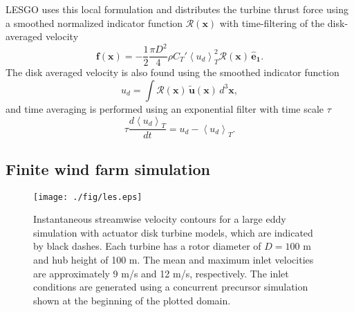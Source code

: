 LESGO uses this local formulation and distributes the turbine thrust force using a smoothed normalized indicator function $\mathcal{R}(\mathbf{x})$ with time-filtering of the disk-averaged velocity 
\begin{equation}
\mathbf{f}(\mathbf{x}) = -\frac{1}{2} \frac{\pi D^2}{4} \rho C_T' \left\langle u_d\right\rangle_T^2 \mathcal{R}(\mathbf{x}) \,\mathbf{\hat{e}_1}.
\end{equation}
The disk averaged velocity is also found using the smoothed indicator function
\begin{equation}
u_d = \int \mathcal{R}(\mathbf{x}) \, \tilde{\mathbf{u}}(\mathbf{x}) \, d^3\mathbf{x},
\end{equation}
and time averaging is performed using an exponential filter with time scale $\tau$
\begin{equation}
\tau \frac{ d \left\langle u_d \right\rangle_T}{dt} = u_d - \left\langle u_d \right\rangle_T.
\end{equation}



\subsection{Finite wind farm simulation}
\label{subsec:methods-les-farm}
\begin{figure}[b!]
\begin{center}
\texttt{[image: ./fig/les.eps]}
\end{center}
\caption{\label{fig:les} Instantaneous streamwise velocity contours for a large eddy simulation with actuator disk turbine models, which are indicated by black dashes. Each turbine has a rotor diameter of $D = 100$ m and hub height of 100 m. The mean and maximum inlet velocities are approximately 9 m/s and 12 m/s, respectively. The inlet conditions are generated using a concurrent precursor simulation~\cite{Stevens2014a} shown at the beginning of the plotted domain.}
\end{figure}


